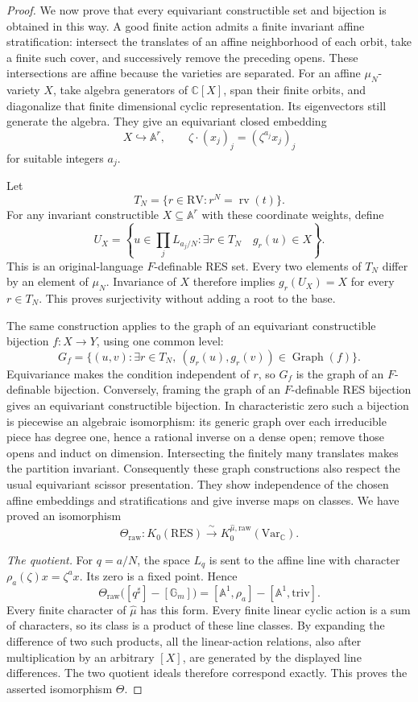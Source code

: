 \documentclass[12pt]{amsart}
\theoremstyle{remark}
\theoremstyle{definition}
\newcommand{\C}{\mathds{C}}
\newcommand{\rv}{\operatorname{rv}}
\newcommand{\RV}{\mathrm{RV}}
\newcommand{\RES}{\mathrm{RES}}
\numberwithin{equation}{section}
\newcommand{\A}{\mathds{A}}
\newcommand{\Gm}{\mathbb G_m}
\newcommand{\Var}{\mathrm{Var}}
\newcommand{\Kres}{K_0(\RES)}
\newcommand{\Kraw}{K_0^{\widehat\mu,\mathrm{raw}}(\Var_{\C})}
\begin{document}
{\begin{proof}
We now prove that every equivariant constructible set and
bijection is obtained in this way. A good finite action admits a
finite invariant affine stratification: intersect the translates
of an affine neighborhood of each orbit, take a finite such
cover, and successively remove the preceding opens. These
intersections are affine because the varieties are separated.
For an affine $\mu_N$-variety $X$, take algebra generators of
$\C[X]$, span their finite orbits, and diagonalize that finite
dimensional cyclic representation. Its eigenvectors still
generate the algebra. They give an equivariant closed embedding
\[
 X\hookrightarrow\A^r,\qquad
 \zeta\cdot(x_j)_j=(\zeta^{a_j}x_j)_j
\]
for suitable integers $a_j$.

Let
\[
 T_N=\{r\in\RV:r^N=\rv(t)\}.
\]
For any invariant constructible
$X\subseteq\A^r$ with these coordinate weights, define
\[
 U_X=\left\{u\in\prod_jL_{a_j/N}:
       \exists r\in T_N\quad g_r(u)\in X\right\}.
\]
This is an original-language $F$-definable RES set.
Every two elements of $T_N$ differ by an element of $\mu_N$.
Invariance of $X$ therefore implies
$g_r(U_X)=X$ for every $r\in T_N$.
This proves surjectivity without adding a root to the base.

The same construction applies to the graph of an equivariant
constructible bijection $f:X\to Y$, using one common level:
\[
 G_f=\{(u,v):\exists r\in T_N,\
              (g_r(u),g_r(v))\in\operatorname{Graph}(f)\}.
\]
Equivariance makes the condition independent of $r$, so $G_f$
is the graph of an $F$-definable bijection.
Conversely, framing the graph of an $F$-definable RES bijection
gives an equivariant constructible bijection.
In characteristic zero such a bijection is piecewise an
algebraic isomorphism: its generic graph over each irreducible
piece has degree one, hence a rational inverse on a dense open;
remove those opens and induct on dimension. Intersecting the
finitely many translates makes the partition invariant.
Consequently these graph constructions also respect the usual
equivariant scissor presentation. They show independence of the
chosen affine embeddings and stratifications and give inverse
maps on classes. We have proved an isomorphism
\[
 \Theta_{\mathrm{raw}}:\Kres\xrightarrow{\ \sim\ }\Kraw .
\]

\emph{The quotient.}
For $q=a/N$, the space $L_q$ is sent to the affine line with
character $\rho_a(\zeta)x=\zeta^a x$. Its zero is a fixed point.
Hence
\[
 \Theta_{\mathrm{raw}}
 \bigl([q^\sharp]-[\Gm]\bigr)
 =
 [\A^1,\rho_a]-[\A^1,\mathrm{triv}].
\]
Every finite character of $\widehat\mu$ has this form.
Every finite linear cyclic action is a sum of characters, so its
class is a product of these line classes. By expanding the
difference of two such products, all the linear-action relations,
also after multiplication by an arbitrary $[X]$, are generated
by the displayed line differences. The two quotient ideals
therefore correspond exactly. This proves the asserted
isomorphism $\Theta$.


\end{proof}}
\end{document}

